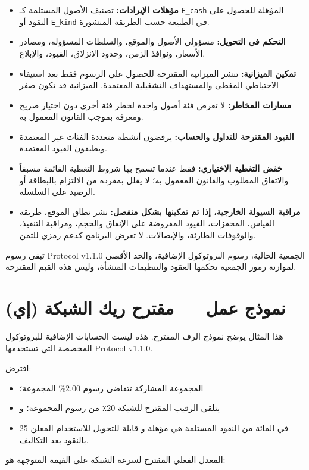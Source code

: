 \documentclass[11pt]{article}
\begin{document}
\begin{itemize}[leftmargin=*]
\item \textbf{مؤهلات الإيرادات:} تصنيف الأصول المستلمة كـ \texttt{E\_cash} المؤهلة للحصول على النقود أو \texttt{E\_kind} في الطبيعة حسب الطريقة المنشورة.
\item \textbf{التحكم في التحويل:} مسؤولي الأصول والموقع، والسلطات المسؤولة، ومصادر الأسعار، ونوافذ الزمن، وحدود الانزلاق، القيود، والإبلاغ.
\item \textbf{تمكين الميزانية:} تنشر الميزانية المقترحة للحصول على الرسوم فقط بعد استيفاء الاحتياطي المغطى والمستهداف التشغيلية المعتمدة. الميزانية قد تكون صفر
\item \textbf{مسارات المخاطر:} لا تعرض فئة أصول واحدة لخطر فئة أخرى دون اختيار صريح ومعرفة بموجب القانون المعمول به.
\item \textbf{القيود المقترحة للتداول والحساب:} يرفضون أنشطة متعددة الفئات غير المعتمدة ويطبقون القيود المعتمدة.
\item \textbf{خفض التغطية الاختياري:} فقط عندما تسمح بها شروط التغطية القائمة مسبقاً والاتفاق المطلوب والقانون المعمول به؛ لا يقلل بمفرده من الالتزام بالبطاقة أو الرصيد على السلسلة.
\item \textbf{مراقبة السيولة الخارجية، إذا تم تمكينها بشكل منفصل:} نشر نطاق الموقع، طريقة القياس، المحفزات، القيود المفروضة على الإنفاق والحجم، ومراقبة التنفيذ، والوقوفات الطارئة، والإيصالات. لا تعرض البرنامج كدعم رمزي للثمن.
\end{itemize}
تبقى رسوم Protocol v1.1.0 الجمعية الحالية، رسوم البروتوكول الإضافية، والحد الأقصى لموازنة رموز الجمعية تحكمها العقود والتنظيمات المنشأة، وليس هذه القيم المقترحة.


\section*{(إي) نموذج عمل --- مقترح ريك الشبكة}

هذا المثال يوضح نموذج الرف المقترح. هذه ليست الحسابات الإضافية للبروتوكول المخصصة التي تستخدمها Protocol v1.1.0.

افترض:

\begin{itemize}[leftmargin=*]
\item المجموعة المشاركة تتقاضى رسوم 2.00\% المجموعة؛
\item يتلقى الرقيب المقترح للشبكة 20٪ من رسوم المجموعة؛ و
\item 25 في المائة من النقود المستلمة هي مؤهلة و قابلة للتحويل للاستخدام المعلن بالنقود بعد التكاليف.
\end{itemize}
المعدل الفعلي المقترح لسرعة الشبكة على القيمة المتوجهة هو:
\end{document}
